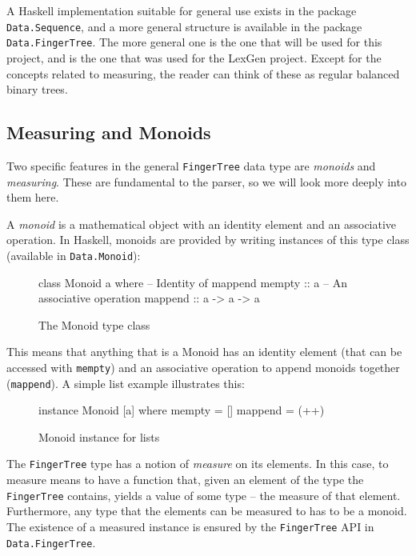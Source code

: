 \documentclass[a4paper,12pt,notitlepage]{report}
\begin{document}
A Haskell implementation suitable for general use exists in the package
\texttt{Data.Sequence}, and a more general structure is available in the
package \texttt{Data.FingerTree}. The more general one is the one that will be
used for this project, and is the one that was used for the LexGen project.
Except for the concepts related to measuring, the reader can think of these as
regular balanced binary trees. 

\subsection{Measuring and Monoids}
\label{measuremonoids}
Two specific features in the general \texttt{FingerTree} data type are
\textit{monoids} and \textit{measuring}. These are fundamental to the parser, so
we will look more deeply into them here. 

A \textit{monoid} is a mathematical object with an identity element and an
associative operation. In Haskell, monoids are provided by writing instances of
this type class (available in \texttt{Data.Monoid}):
\begin{figure}[H]
\begin{code}
class Monoid a where
    -- Identity of mappend
    mempty  :: a
    -- An associative operation
    mappend :: a -> a -> a
\end{code}
\caption{\small The Monoid type class}
\end{figure}

This means that anything that is a Monoid has an identity element (that can be
accessed with \texttt{mempty}) and an associative operation to append monoids
together (\texttt{mappend}). A simple list example illustrates this:

\begin{figure}[H]
\begin{code}
instance Monoid [a] where
    mempty = []
    mappend = (++)
\end{code}
\caption{\small Monoid instance for lists}
\end{figure}

The \texttt{FingerTree} type has a notion of \textit{measure} on its elements.
In this case, to measure means to have a function that, given an element of the
type the \texttt{FingerTree} contains, yields a value of some type -- the
measure of that element. Furthermore, any type that the elements can be measured
to has to be a monoid. The existence of a measured instance is ensured by the
\texttt{FingerTree} API in \texttt{Data.FingerTree}.
\end{document}
